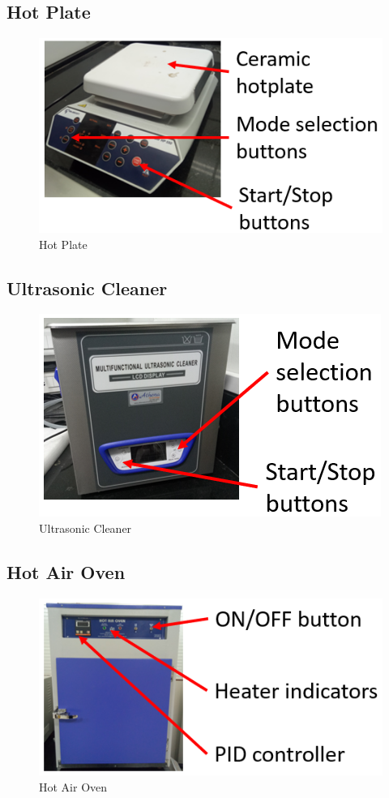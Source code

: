 \subsection{Hot Plate}
\begin{figure}[H]
	\centering
		
		\includegraphics{6.png}
		\caption{Hot Plate}
\end{figure}
\subsection{Ultrasonic Cleaner}
\begin{figure}[H]
	\centering
		
		\includegraphics{7.png}
		\caption{Ultrasonic Cleaner}
\end{figure}
\subsection{Hot Air Oven}
\begin{figure}[H]
	\centering
		
		\includegraphics{8.png}
		\caption{Hot Air Oven}
\end{figure}
